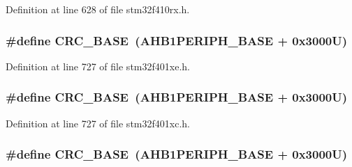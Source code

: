 Definition at line 628 of file stm32f410rx.\+h.

\subsubsection[{\texorpdfstring{C\+R\+C\+\_\+\+B\+A\+SE}{CRC_BASE}}]{\setlength{\rightskip}{0pt plus 5cm}\#define C\+R\+C\+\_\+\+B\+A\+SE~({\bf A\+H\+B1\+P\+E\+R\+I\+P\+H\+\_\+\+B\+A\+SE} + 0x3000\+U)}\hypertarget{group___peripheral__registers__structures_ga656a447589e785594cbf2f45c835ad7e}{}\label{group___peripheral__registers__structures_ga656a447589e785594cbf2f45c835ad7e}


Definition at line 727 of file stm32f401xe.\+h.

\subsubsection[{\texorpdfstring{C\+R\+C\+\_\+\+B\+A\+SE}{CRC_BASE}}]{\setlength{\rightskip}{0pt plus 5cm}\#define C\+R\+C\+\_\+\+B\+A\+SE~({\bf A\+H\+B1\+P\+E\+R\+I\+P\+H\+\_\+\+B\+A\+SE} + 0x3000\+U)}\hypertarget{group___peripheral__registers__structures_ga656a447589e785594cbf2f45c835ad7e}{}\label{group___peripheral__registers__structures_ga656a447589e785594cbf2f45c835ad7e}


Definition at line 727 of file stm32f401xc.\+h.

\subsubsection[{\texorpdfstring{C\+R\+C\+\_\+\+B\+A\+SE}{CRC_BASE}}]{\setlength{\rightskip}{0pt plus 5cm}\#define C\+R\+C\+\_\+\+B\+A\+SE~({\bf A\+H\+B1\+P\+E\+R\+I\+P\+H\+\_\+\+B\+A\+SE} + 0x3000\+U)}\hypertarget{group___peripheral__registers__structures_ga656a447589e785594cbf2f45c835ad7e}{}\label{group___peripheral__registers__structures_ga656a447589e785594cbf2f45c835ad7e}


